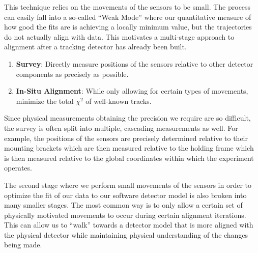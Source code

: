 This technique relies on the movements of the sensors to be small.
The process can easily fall into a so-called ``Weak Mode'' where our quantitative measure of
how good the fits are is achieving a locally minimum value, but the trajectories do not actually
align with data.
This motivates a multi-stage approach to alignment after a tracking detector has already been built.

\begin{enumerate}
  \item \textbf{Survey}: Directly measure positions of the sensors relative to other
        detector components as precisely as possible.
  \item \textbf{In-Situ Alignment}: While only allowing for certain types of movements,
        minimize the total $\chi^2$ of well-known tracks.
\end{enumerate}

Since physical measurements obtaining the precision we require are so difficult, the survey is
often split into multiple, cascading measurements as well.
For example, the positions of the sensors are precisely determined relative to their mounting
brackets which are then measured relative to the holding frame which is then measured relative
to the global coordinates within which the experiment operates.

The second stage where we perform small movements of the sensors in order to optimize the fit of
our data to our software detector model is also broken into many smaller stages.
The most common way is to only allow a certain set of physically motivated movements to occur
during certain alignment iterations.
This can allow us to ``walk'' towards a detector model that is more aligned
with the physical detector while maintaining physical understanding of the changes being made.

